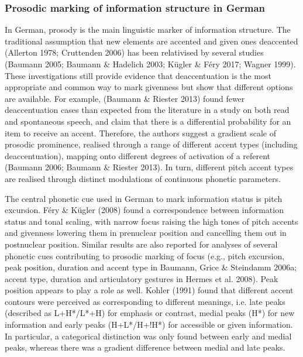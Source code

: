 \subsubsection[Prosodic marking of information structure in German]{Prosodic marking of information structure in German}
\hypertarget{Toc191305888}{}\begin{styleStandard}
In German, prosody is the main linguistic marker of information structure. The traditional assumption that new elements are accented and given ones deaccented (Allerton 1978; Cruttenden 2006) has been relativised by several studies (Baumann 2005; Baumann \& Hadelich 2003; Kügler \& Féry 2017; Wagner 1999). These investigations still provide evidence that deaccentuation is the most appropriate and common way to mark givenness but show that different options are available. For example, (Baumann \& Riester 2013) found fewer deaccentuation cases than expected from the literature in a study on both read and spontaneous speech, and claim that there is a differential probability for an item to receive an accent. Therefore, the authors suggest a gradient scale of prosodic prominence, realised through a range of different accent types (including deaccentuation), mapping onto different degrees of activation of a referent (Baumann 2006; Baumann \& Riester 2013). In turn, different pitch accent types are realised through distinct modulations of continuous phonetic parameters.
\end{styleStandard}

\begin{styleStandard}
The central phonetic cue used in German to mark information status is pitch excursion. Féry \& Kügler (2008) found a correspondence between information status and tonal scaling, with narrow focus raising the high tones of pitch accents and givenness lowering them in prenuclear position and cancelling them out in postnuclear position. Similar results are also reported for analyses of several phonetic cues contributing to prosodic marking of focus (e.g., pitch excursion, peak position, duration and accent type in Baumann, Grice \& Steindamm 2006a; accent type, duration and articulatory gestures in Hermes et al. 2008). Peak position appears to play a role as well. Kohler (1991) found that different accent contours were perceived as corresponding to different meanings, i.e. late peaks (described as L+H*/L*+H) for emphasis or contrast, medial peaks (H*) for new information and early peaks (H+L*/H+!H*) for accessible or given information. In particular, a categorical distinction was only found between early and medial peaks, whereas there was a gradient difference between medial and late peaks. 
\end{styleStandard}

